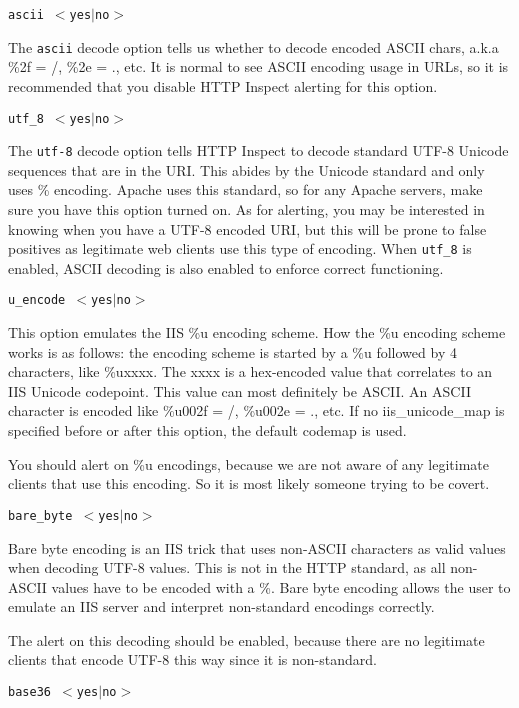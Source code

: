 \documentclass[english]{report}
\newcounter{slistnum}
\newenvironment{slist}
{ \begin{list}{ {\bf \arabic{slistnum}.} }{\usecounter{slistnum} } }
{ \end{list} }
\begin{document}
\begin{slist}
\item \texttt{ascii $<$yes$|$no$>$}

The \texttt{ascii} decode option tells us whether to decode encoded ASCII
chars, a.k.a \%2f = /, \%2e = ., etc.  It is normal to see ASCII encoding usage
in URLs, so it is recommended that you disable HTTP Inspect alerting for this
option.

\item \texttt{utf\_8 $<$yes$|$no$>$}

The \texttt{utf-8} decode option tells HTTP Inspect to decode standard UTF-8
Unicode sequences that are in the URI.  This abides by the Unicode standard and
only uses \% encoding.  Apache uses this standard, so for any Apache servers,
make sure you have this option turned on.  As for alerting, you may be
interested in knowing when you have a UTF-8 encoded URI, but this will be prone
to false positives as legitimate web clients use this type of encoding.  When
\texttt{utf\_8} is enabled, ASCII decoding is also enabled to enforce correct
functioning.  

\item \texttt{u\_encode $<$yes$|$no$>$}

This option emulates the IIS \%u encoding scheme.  How the \%u encoding scheme
works is as follows:  the encoding scheme is started by a \%u followed by 4
characters, like \%uxxxx.  The xxxx is a hex-encoded value that correlates to
an IIS Unicode codepoint.  This value can most definitely be ASCII.  An ASCII
character is encoded like \%u002f = /, \%u002e = ., etc.  If no
iis\_unicode\_map is specified before or after this option, the default codemap
is used.

You should alert on \%u encodings, because we are not aware of any legitimate
clients that use this encoding.  So it is most likely someone trying to be
covert.

\item \texttt{bare\_byte $<$yes$|$no$>$}

Bare byte encoding is an IIS trick that uses non-ASCII characters as valid
values when decoding UTF-8 values.  This is not in the HTTP standard, as all
non-ASCII values have to be encoded with a \%.  Bare byte encoding allows the
user to emulate an IIS server and interpret non-standard encodings correctly.

The alert on this decoding should be enabled, because there are no legitimate
clients that encode UTF-8 this way since it is non-standard.

\item \texttt{base36 $<$yes$|$no$>$}


\end{slist}
\end{document}
